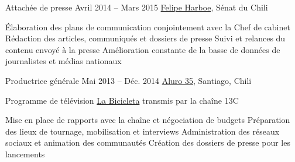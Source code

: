 %
%



\begin{joblist}




\item[Attachée de presse]{Avril 2014 -- Mars 2015}
     { \href{https://www.harboe.cl/}{Felipe Harboe}, Sénat du Chili } 
	 {
			\vspace{-0.5cm}
			\iftbftiny \setlength{\parskip}{-10pt} \fi
			\begin{itemize}
			  \iftbftiny \setlength\itemsep{-3pt} \fi
			  \cvitem[\checkmark] Élaboration des plans de communication conjointement avec la Chef de cabinet
			  \cvitem[\checkmark] Rédaction des articles, communiqués et dossiers de presse
			  \cvitem[\checkmark] Suivi et relances du contenu envoyé à la presse
			  \cvitem[\checkmark] Amélioration constante de la basse de données de journalistes et médias nationaux
			\end{itemize}     
			
	}
    
    
\vspace{-0.2cm}    
\item[Productrice générale]{Mai 2013 -- Déc. 2014}
     {\href{https://www.aluro35.com/}  {Aluro 35}, Santiago, Chili}
     {Programme de télévision \href{http://www.13.cl/c/programas/la-bicicleta}{La Bicicleta} transmis par la chaîne 13C \\
			\vspace{-0.5cm}			
			\iftbftiny \setlength{\parskip}{-10pt} \fi
			\begin{itemize}
			  \iftbftiny \setlength\itemsep{-3pt} \fi
			  \cvitem[\checkmark] Mise en place de rapports avec la chaîne et négociation de budgets                       
			  \cvitem[\checkmark] Préparation des lieux de tournage, mobilisation et interviews
			  \cvitem[\checkmark] Administration des réseaux sociaux et animation des communautés                
			  \cvitem[\checkmark] Création des dossiers de presse pour les lancements                                            
			\end{itemize}     
			
}
\end{joblist}
